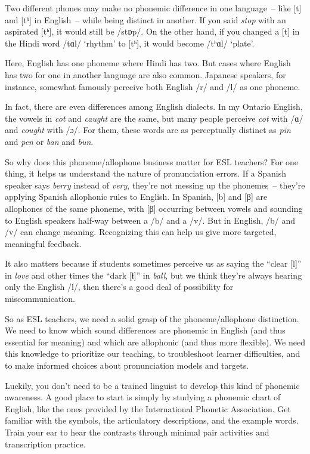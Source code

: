 Two different phones may make no phonemic difference in one language~-- like [t] and [tʰ] in English~-- while being distinct in another. If you said \textit{stop} with an aspirated [tʰ], it would still be /stɒp/. On the other hand, if you changed a [t] in the Hindi word /tɑl/ `rhythm' to [tʰ], it would become /tʰɑl/ `plate'.

Here, English has one phoneme where Hindi has two. But cases where English has two for one in another language are also common. Japanese speakers, for instance, somewhat famously perceive both English /r/ and /l/ as one phoneme.

In fact, there are even differences among English dialects. In my Ontario English, the vowels in \textit{cot} and \textit{caught} are the same, but many people perceive \textit{cot} with /ɑ/ and \textit{cought} with /ɔ/. For them, these words are as perceptually distinct as \textit{pin} and \textit{pen} or \textit{ban} and \textit{bun}.

So why does this phoneme/allophone business matter for ESL teachers? For one thing, it helps us understand the nature of pronunciation errors. If a Spanish speaker says \textit{berry} instead of \textit{very}, they're not messing up the phonemes~-- they're applying Spanish allophonic rules to English. In Spanish, [b] and [β] are allophones of the same phoneme, with [β] occurring between vowels and sounding to English speakers half-way between a /b/ and a /v/. But in English, /b/ and /v/ can change meaning. Recognizing this can help us give more targeted, meaningful feedback.

It also matters because if students sometimes perceive us as saying the ``clear [l]'' in \textit{love} and other times the ``dark [ɫ]'' in \textit{ball}, but we think they're always hearing only the English /l/, then there's a good deal of possibility for miscommunication.

So as ESL teachers, we need a solid grasp of the phoneme/allophone distinction. We need to know which sound differences are phonemic in English (and thus essential for meaning) and which are allophonic (and thus more flexible). We need this knowledge to prioritize our teaching, to troubleshoot learner difficulties, and to make informed choices about pronunciation models and targets.

Luckily, you don't need to be a trained linguist to develop this kind of phonemic awareness. A good place to start is simply by studying a phonemic chart of English, like the ones provided by the International Phonetic Association. Get familiar with the symbols, the articulatory descriptions, and the example words. Train your ear to hear the contrasts through minimal pair activities and transcription practice. 

